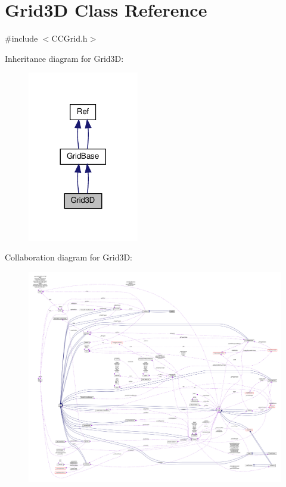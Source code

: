 \hypertarget{classGrid3D}{}\section{Grid3D Class Reference}
\label{classGrid3D}


{\ttfamily \#include $<$C\+C\+Grid.\+h$>$}



Inheritance diagram for Grid3D\+:
\nopagebreak
\begin{figure}[H]
\begin{center}
\leavevmode
\includegraphics[width=137pt]{classGrid3D__inherit__graph}
\end{center}
\end{figure}


Collaboration diagram for Grid3D\+:
\nopagebreak
\begin{figure}[H]
\begin{center}
\leavevmode
\includegraphics[width=350pt]{classGrid3D__coll__graph}
\end{center}
\end{figure}
